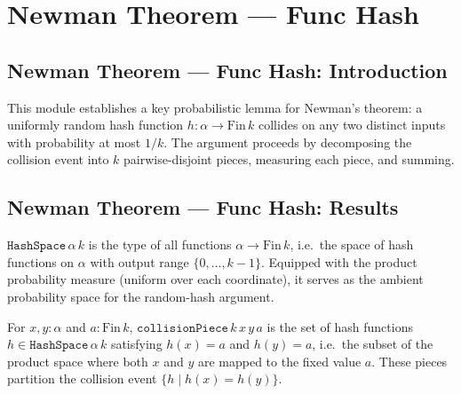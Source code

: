 \section{Newman Theorem --- Func Hash}
\subsection*{Newman Theorem --- Func Hash: Introduction}

This module establishes a key probabilistic lemma for Newman's theorem: a uniformly
random hash function $h : \alpha \to \mathrm{Fin}\,k$ collides on any two distinct
inputs with probability at most $1/k$.  The argument proceeds by decomposing the
collision event into $k$ pairwise-disjoint pieces, measuring each piece, and summing.

\subsection*{Newman Theorem --- Func Hash: Results}

\begin{definition}
\label{CommunicationComplexity.Functions.Hash.HashSpace}
\leanok
$\texttt{HashSpace}\,\alpha\,k$ is the type of all functions $\alpha \to \mathrm{Fin}\,k$,
i.e.\ the space of hash functions on $\alpha$ with output range $\{0,\dots,k-1\}$.
Equipped with the product probability measure (uniform over each coordinate), it serves
as the ambient probability space for the random-hash argument.
\end{definition}

\begin{definition}
\label{CommunicationComplexity.Functions.Hash.collisionPiece}
\leanok
{}
For $x, y : \alpha$ and $a : \mathrm{Fin}\,k$, $\texttt{collisionPiece}\,k\,x\,y\,a$ is
the set of hash functions $h \in \texttt{HashSpace}\,\alpha\,k$ satisfying $h(x) = a$ and
$h(y) = a$, i.e.\ the subset of the product space where both $x$ and $y$ are mapped to
the fixed value $a$.  These pieces partition the collision event $\{h \mid h(x) = h(y)\}$.
\end{definition}

